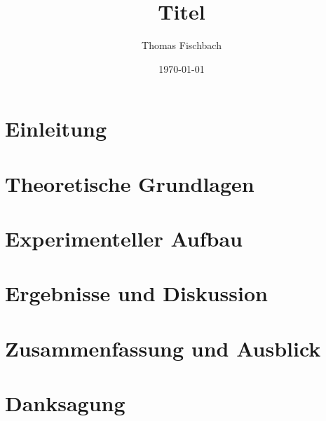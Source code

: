 \documentclass[a4paper,12pt]{article}
\begin{document}
\title{\vspace{30mm} \bf{Titel}}
\author{Thomas Fischbach}
\date{\today}
\maketitle

\vfill
  
  
  
  
\tableofcontents
  
\newpage
  
\section{Einleitung}

\section{Theoretische Grundlagen}

\section{Experimenteller Aufbau}

\section{Ergebnisse und Diskussion}

\section{Zusammenfassung und Ausblick}

%
%
\section{Danksagung}



\end{document}
